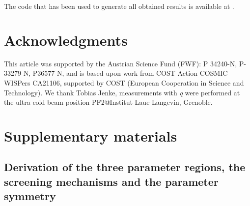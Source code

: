 \documentclass[aps,pra,twocolumn,floatfix,superscriptaddress,nofootinbib,showpacs,a4paper,balancelastpage,twoside]{revtex4-2}
\newcommand{\qbounce}{{\it{q}}{\sc{Bounce}}}				%
\begin{document}
The code that has been used to generate all obtained results is available at \cite{H.Fischer_DilatonCode}.

\section{Acknowledgments}

This article was supported by the Austrian Science Fund (FWF): P 34240-N, P-33279-N, P36577-N, and is based upon work from COST Action COSMIC WISPers CA21106,
supported by COST (European Cooperation in Science and Technology).
We thank Tobias Jenke, measurements with \qbounce{} were performed at the ultra-cold beam position PF2@Institut Laue-Langevin, Grenoble.

\appendix
\section{Supplementary materials}

\subsection{Derivation of the three parameter regions, the screening mechanisms and the parameter symmetry}\label{AppSM1}
\end{document}
